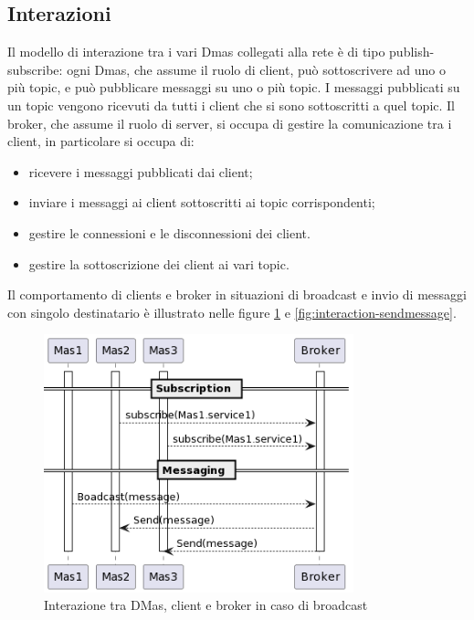 \subsection{Interazioni}
Il modello di interazione tra i vari Dmas collegati alla rete è di tipo publish-subscribe: ogni Dmas, che assume il ruolo di client, può sottoscrivere ad uno o più topic, e può pubblicare messaggi su uno o più topic.
I messaggi pubblicati su un topic vengono ricevuti da tutti i client che si sono sottoscritti a quel topic.
Il broker, che assume il ruolo di server, si occupa di gestire la comunicazione tra i client, in particolare si occupa di:
\begin{itemize}
    \item ricevere i messaggi pubblicati dai client;
    \item inviare i messaggi ai client sottoscritti ai topic corrispondenti;
    \item gestire le connessioni e le disconnessioni dei client.
    \item gestire la sottoscrizione dei client ai vari topic.
\end{itemize}

Il comportamento di clients e broker in situazioni di broadcast e invio di messaggi con singolo destinatario è illustrato nelle figure \ref{fig:interaction-broadcast} e \ref{fig:interaction-sendmessage}.

\begin{figure}[ht!]
    \centering
    \includegraphics[width=0.8\textwidth]{figures/interaction-broadcast.png}
    \caption{Interazione tra DMas, client e broker in caso di broadcast}
    \label{fig:interaction-broadcast}
\end{figure}

